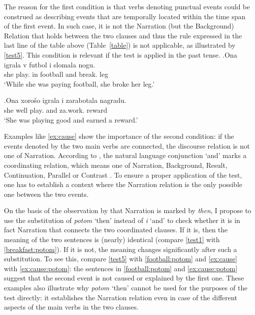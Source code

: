 The reason for the first condition is that verbs denoting punctual events could be construed as describing events that are temporally located within the time span of the first event. In such case, it is not the Narration (but the Background) Relation that holds between the two clauses and thus the rule expressed in the last line of the table above (Table~\ref{table}) is not applicable, as illustrated by \ref{test5}. This condition is relevant if the test is applied in the past tense.
\exg.\label{test5}Ona igrala\textsuperscript{\IPF} v futbol i slomala\textsuperscript{\PF} nogu.\\
she play. in football and break. leg\\
\trans `While she was paying football, she broke her leg.'

\exg.\label{ex:cause}Ona xoro\v{s}o igrala\textsuperscript{\IPF} i zarabotala\textsuperscript{\PF} nagradu.\\
she well play. and za.work. reward\\
\trans `She was playing good and earned a reward.'

Examples like \ref{ex:cause} show the importance of the second condition: if the events denoted by the two main verbs are connected, the discourse relation is not one of Narration. According to \citet{Txurruka:03}, the natural language conjunction `and' marks a coordinating relation, which means one of Narration, Background, Result, Continuation, Parallel or Contrast \citep{Asher:05}. To ensure a proper application of the test, one has to establish a context where the Narration relation is the only possible one between the two events. 

On the basis of the observation by \citet{Txurruka:03} that Narration is marked by \textit{then}, I propose to use the substitution of \textit{potom} `then' instead of \textit{i} `and' to check whether it is in fact Narration that connects the two coordinated clauses. If it is, then the meaning of the two sentences is (nearly) identical (compare \ref{test1} with \ref{breakfast:potom}). If it is not, the meaning changes significantly after such a substitution. To see this, compare \ref{test5} with \ref{football:potom} and \ref{ex:cause} with \ref{ex:cause:potom}: the sentences in \ref{football:potom} and \ref{ex:cause:potom} suggest that the second event is not caused or explained by the first one. These examples also illustrate why \textit{potom} `then' cannot be used for the purposes of the test directly: it establishes the Narration relation even in case of the different aspects of the main verbs in the two clauses.

